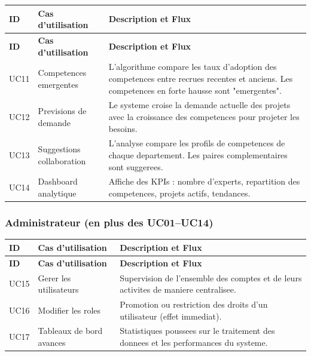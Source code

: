 \documentclass[12pt,a4paper]{article}
\begin{document}
\begin{longtable}{|p{1cm}|p{4cm}|p{8.5cm}|}
\toprule
\rowcolor{bleu!15}
\textbf{ID} & \textbf{Cas d'utilisation} & \textbf{Description et Flux} \\
\midrule
\endfirsthead
\toprule
\rowcolor{bleu!15}
\textbf{ID} & \textbf{Cas d'utilisation} & \textbf{Description et Flux} \\
\midrule
\endhead
UC11 & Competences emergentes & L'algorithme compare les taux d'adoption des competences entre recrues recentes et anciens. Les competences en forte hausse sont "emergentes". \\
\midrule
UC12 & Previsions de demande & Le systeme croise la demande actuelle des projets avec la croissance des competences pour projeter les besoins. \\
\midrule
UC13 & Suggestions collaboration & L'analyse compare les profils de competences de chaque departement. Les paires complementaires sont suggerees. \\
\midrule
UC14 & Dashboard analytique & Affiche des KPIs : nombre d'experts, repartition des competences, projets actifs, tendances. \\
\bottomrule
\end{longtable}

\subsubsection{Administrateur (en plus des UC01--UC14)}

\begin{longtable}{|p{1cm}|p{4cm}|p{8.5cm}|}
\toprule
\rowcolor{bleu!15}
\textbf{ID} & \textbf{Cas d'utilisation} & \textbf{Description et Flux} \\
\midrule
\endfirsthead
\toprule
\rowcolor{bleu!15}
\textbf{ID} & \textbf{Cas d'utilisation} & \textbf{Description et Flux} \\
\midrule
\endhead
UC15 & Gerer les utilisateurs & Supervision de l'ensemble des comptes et de leurs activites de maniere centralisee. \\
\midrule
UC16 & Modifier les roles & Promotion ou restriction des droits d'un utilisateur (effet immediat). \\
\midrule
UC17 & Tableaux de bord avances & Statistiques poussees sur le traitement des donnees et les performances du systeme. \\
\bottomrule
\end{longtable}

\end{document}
